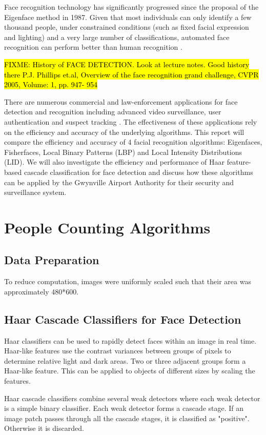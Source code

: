 \documentclass{article}
\begin{document}
Face recognition technology has significantly progressed since the proposal of the Eigenface method in 1987. Given that most individuals can only identify a few thousand people, under constrained conditions (such as fixed facial expression and lighting) and a very large number of classifications, automated face recognition can perform better than human recognition \cite{li2011handbook}.

\hl{FIXME: History of FACE DETECTION. Look at lecture notes. Good history there P.J. Phillips et.al, Overview of the face recognition grand challenge, CVPR 2005, Volume: 1, pp. 947- 954 }

There are numerous commercial and law-enforcement applications for face detection and recognition including advanced video surveillance, user authentication and suspect tracking \cite{zhao2003face}. The effectiveness of these applications rely on the efficiency and accuracy of the underlying algorithms. This report will compare the efficiency and accuracy of 4 facial recognition algorithms: Eigenfaces, Fisherfaces, Local Binary Patterns (LBP) and Local Intensity Distributions (LID). We will also investigate the efficiency and performance of Haar feature-based cascade classification for face detection and discuss how these algorithms can be applied by the Gwynville Airport Authority for their security and surveillance system.



\section{People Counting Algorithms}
\subsection{Data Preparation}
To reduce computation, images were uniformly scaled such that their area was approximately 480*600.

\subsection{Haar Cascade Classifiers for Face Detection}
Haar classifiers can be used to rapidly detect faces within an image in real time. Haar-like features use the contrast variances between groups of pixels to determine relative light and dark areas. Two or three adjacent groups form a Haar-like feature. This can be applied to objects of different sizes by scaling the features.

Haar cascade classifiers combine several weak detectors where each weak detector is a simple binary classifier. Each weak detector forms a cascade stage.
If an image patch passes through all the cascade stages, it is classified as "positive". Otherwise it is discarded.
\end{document}

